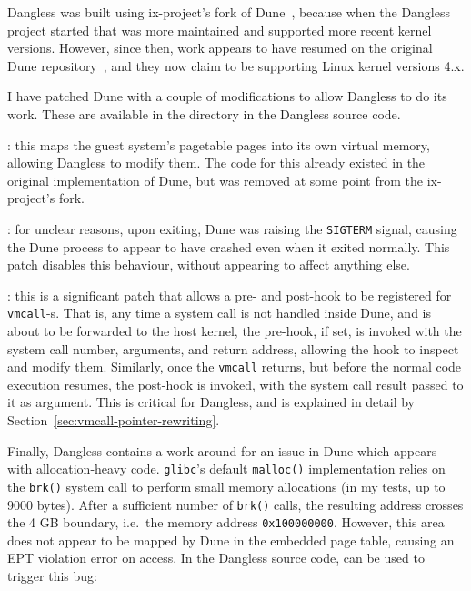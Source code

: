 Dangless was built using ix-project's fork of Dune~\cite{dune-github-ix}, because when the Dangless project started that was more maintained and supported more recent kernel versions. However, since then, work appears to have resumed on the original Dune repository~\cite{dune-github-original}, and they now claim to be supporting Linux kernel versions 4.x.

I have patched Dune with a couple of modifications to allow Dangless to do its work. These are available in the  directory in the Dangless source code.

: this maps the guest system's pagetable pages into its own virtual memory, allowing Dangless to modify them. The code for this already existed in the original implementation of Dune, but was removed at some point from the ix-project's fork.
 
: for unclear reasons, upon exiting, Dune was raising the \lstinline!SIGTERM! signal, causing the Dune process to appear to have crashed even when it exited normally. This patch disables this behaviour, without appearing to affect anything else.

: this is a significant patch that allows a pre- and post-hook to be registered for \lstinline!vmcall!-s. That is, any time a system call is not handled inside Dune, and is about to be forwarded to the host kernel, the pre-hook, if set, is invoked with the system call number, arguments, and return address, allowing the hook to inspect and modify them. Similarly, once the \lstinline!vmcall! returns, but before the normal code execution resumes, the post-hook is invoked, with the system call result passed to it as argument. This is critical for Dangless, and is explained in detail by Section~\ref{sec:vmcall-pointer-rewriting}.

Finally, Dangless contains a work-around for an issue in Dune which appears with allocation-heavy code. \texttt{glibc}'s default \lstinline!malloc()! implementation relies on the \lstinline!brk()! system call to perform small memory allocations (in my tests, up to 9000 bytes). After a sufficient number of \lstinline!brk()! calls, the resulting address crosses the 4 GB boundary, i.e.\ the memory address \texttt{0x100000000}. However, this area does not appear to be mapped by Dune in the embedded page table, causing an EPT violation error on access. In the Dangless source code,  can be used to trigger this bug:

